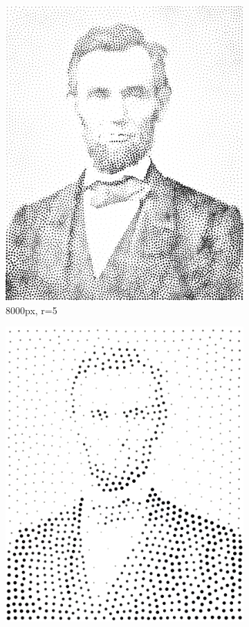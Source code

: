 \documentclass[11pt]{article}
\begin{document}
\begin{figure}[H]
\begin{subfigure}[b]{0.2\linewidth}
		\includegraphics[width=\linewidth]{pix/hc_AL_8000_r5.png}
		\caption{8000px, r=5}
	\end{subfigure}
	\begin{subfigure}[b]{0.2\linewidth}
		\includegraphics[width=\linewidth]{pix/hc_AL_1000_r10.png}

\end{subfigure}
\end{figure}
\end{document}
